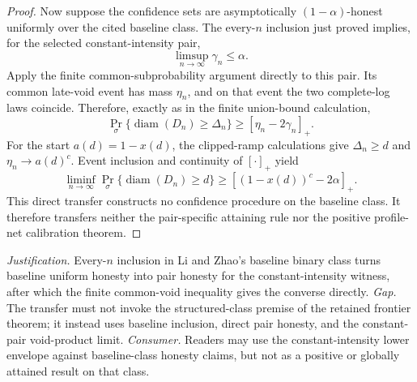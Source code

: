 \documentclass{article}
\begin{document}
\begin{proof}
Now suppose the confidence sets are asymptotically \((1-\alpha)\)-honest uniformly over the cited baseline class.  The every-\(n\) inclusion just proved implies, for the selected constant-intensity pair,
\[
 \limsup_{n\to\infty}\gamma_n\le\alpha.
\]
Apply the finite common-subprobability argument directly to this pair.  Its common late-void event has mass \(\eta_n\), and on that event the two complete-log laws coincide.  Therefore, exactly as in the finite union-bound calculation,
\[
 \Pr_\sigma\{\operatorname{diam}(D_n)\ge\Delta_n\}
 \ge[\eta_n-2\gamma_n]_+.
\]
For the start \(a(d)=1-x(d)\), the clipped-ramp calculations give \(\Delta_n\ge d\) and \(\eta_n\to a(d)^c\).  Event inclusion and continuity of \([\cdot]_+\) yield
\[
 \liminf_{n\to\infty}
 \Pr_\sigma\{\operatorname{diam}(D_n)\ge d\}
 \ge[(1-x(d))^c-2\alpha]_+.
\]
This direct transfer constructs no confidence procedure on the baseline class.  It therefore transfers neither the pair-specific attaining rule nor the positive profile-net calibration theorem.
\end{proof}
\par\smallskip\noindent \textit{Justification.} Every-\(n\) inclusion in Li and Zhao's baseline binary class turns baseline uniform honesty into pair honesty for the constant-intensity witness, after which the finite common-void inequality gives the converse directly. \textit{Gap.} The transfer must not invoke the structured-class premise of the retained frontier theorem; it instead uses baseline inclusion, direct pair honesty, and the constant-pair void-product limit. \textit{Consumer.} Readers may use the constant-intensity lower envelope against baseline-class honesty claims, but not as a positive or globally attained result on that class.
\end{document}
